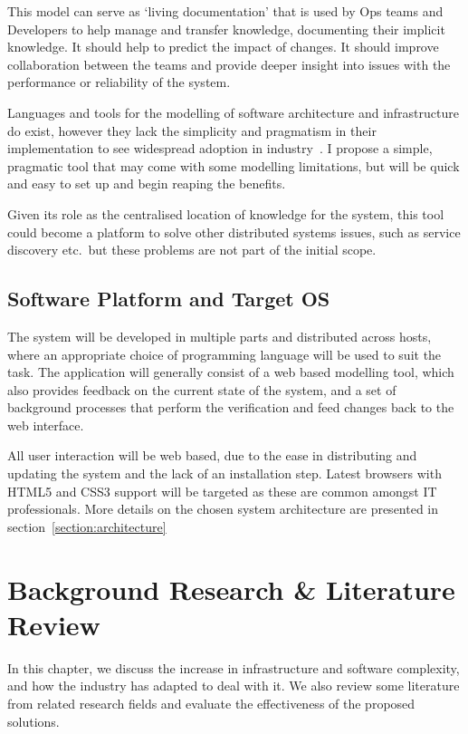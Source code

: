 \documentclass{cshonours}
\begin{document}
This model can serve as `living documentation' that is used by Ops teams and Developers to help manage and transfer knowledge, documenting their implicit knowledge. It should help to predict the impact of changes. It should improve collaboration between the teams and provide deeper insight into issues with the performance or reliability of the system.

Languages and tools for the modelling of software architecture and infrastructure do exist, however they lack the simplicity and pragmatism in their implementation to see widespread adoption in industry~\cite{ModellingAdoption}. I propose a simple, pragmatic tool that may come with some modelling limitations, but will be quick and easy to set up and begin reaping the benefits.

Given its role as the centralised location of knowledge for the system, this tool could become a platform to solve other distributed systems issues, such as service discovery etc.\ but these problems are not part of the initial scope.

\section{Software Platform and Target OS}

The system will be developed in multiple parts and distributed across hosts, where an appropriate choice of programming language will be used to suit the task. The application will generally consist of a web based modelling tool, which also provides feedback on the current state of the system, and a set of background processes that perform the verification and feed changes back to the web interface.

All user interaction will be web based, due to the ease in distributing and updating the system and the lack of an installation step. Latest browsers with HTML5 and CSS3 support will be targeted as these are common amongst IT professionals. More details on the chosen system architecture are presented in section~\ref{section:architecture}

\chapter{Background Research \& Literature Review}

In this chapter, we discuss the increase in infrastructure and software complexity, and how the industry has adapted to deal with it. We also review some literature from related research fields and evaluate the effectiveness of the proposed solutions.
\end{document}
